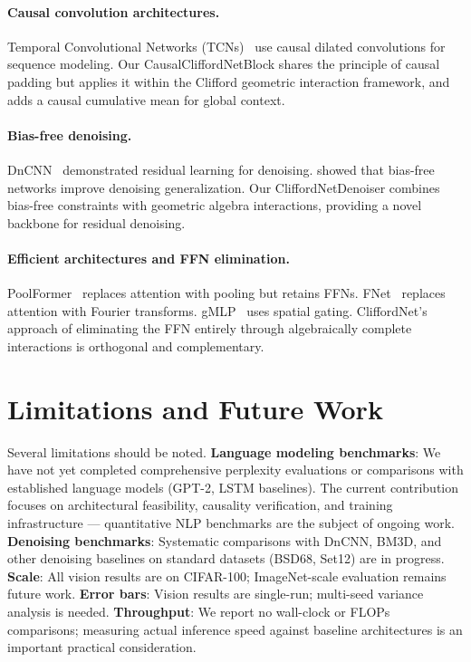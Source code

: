 \documentclass{article}
\begin{document}
\paragraph{Causal convolution architectures.}
Temporal Convolutional Networks (TCNs)~\citep{bai2018empirical} use causal dilated convolutions for sequence modeling.
Our CausalCliffordNetBlock shares the principle of causal padding but applies it within the Clifford geometric interaction framework, and adds a causal cumulative mean for global context.

\paragraph{Bias-free denoising.}
DnCNN~\citep{zhang2017beyond} demonstrated residual learning for denoising.
\citet{mohan2020robust} showed that bias-free networks improve denoising generalization.
Our CliffordNetDenoiser combines bias-free constraints with geometric algebra interactions, providing a novel backbone for residual denoising.

\paragraph{Efficient architectures and FFN elimination.}
PoolFormer~\citep{yu2022metaformer} replaces attention with pooling but retains FFNs.
FNet~\citep{lee2021fnet} replaces attention with Fourier transforms.
gMLP~\citep{liu2021pay} uses spatial gating.
CliffordNet's approach of eliminating the FFN entirely through algebraically complete interactions is orthogonal and complementary.

\section{Limitations and Future Work}
\label{sec:limitations}

Several limitations should be noted.
\textbf{Language modeling benchmarks}: We have not yet completed comprehensive perplexity evaluations or comparisons with established language models (GPT-2, LSTM baselines). The current contribution focuses on architectural feasibility, causality verification, and training infrastructure --- quantitative NLP benchmarks are the subject of ongoing work.
\textbf{Denoising benchmarks}: Systematic comparisons with DnCNN, BM3D, and other denoising baselines on standard datasets (BSD68, Set12) are in progress.
\textbf{Scale}: All vision results are on CIFAR-100; ImageNet-scale evaluation remains future work.
\textbf{Error bars}: Vision results are single-run; multi-seed variance analysis is needed.
\textbf{Throughput}: We report no wall-clock or FLOPs comparisons; measuring actual inference speed against baseline architectures is an important practical consideration.
\end{document}
